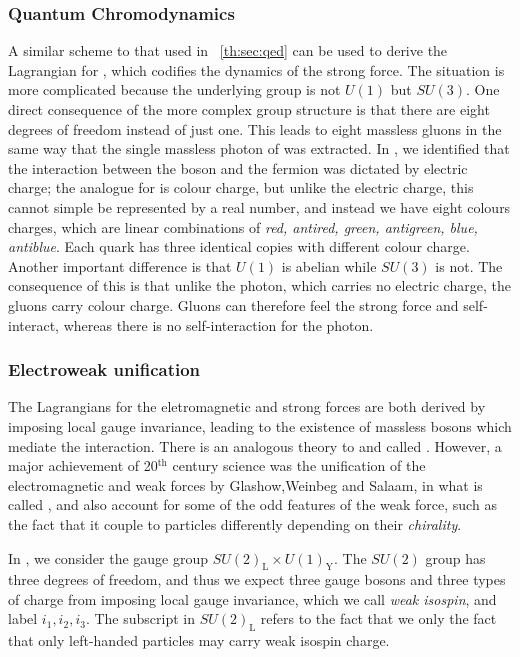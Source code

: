 \subsubsection{Quantum Chromodynamics}

A similar scheme to that used in \Sec~\ref{th:sec:qed} can be used to derive the Lagrangian for \QCD, which codifies the dynamics of the strong force. The situation is more complicated because the underlying group is not $U(1)$ but $SU(3)$. One direct consequence of the more complex group structure is that there are eight degrees of freedom instead of just one. This leads to eight massless gluons in the same way that the single massless photon of \QED was extracted. In \QED, we identified that the interaction between the boson and the fermion was dictated by electric charge; the analogue for \QCD is colour charge, but unlike the electric charge, this cannot simple be represented by a real number, and instead we have eight colours charges, which are linear combinations of \emph{red, antired, green, antigreen, blue, antiblue}. Each \SM quark has three identical copies with different colour charge. Another important difference is that $U(1)$ is abelian while $SU(3)$ is not. The consequence of this is that unlike the \QED photon, which carries no electric charge, the \QCD gluons carry colour charge. Gluons can therefore feel the strong force and self-interact, whereas there is no self-interaction for the photon.

\subsubsection{Electroweak unification}

The Lagrangians for the eletromagnetic and strong forces are both derived by imposing local gauge invariance, leading to the existence of massless bosons which mediate the interaction. There is an analogous theory to \QED and \QCD called \QFD. However, a major achievement of 20$^{\textrm{th}}$ century science was the unification of the electromagnetic and weak forces by Glashow,Weinbeg and Salaam, in what is called \EWT, and also account for some of the odd features of the weak force, such as the fact that it couple to particles differently depending on their \emph{chirality}.

In \EWT, we consider the gauge group $SU(2)_{\textrm{L}} \times U(1)_{\textrm{Y}}$. The $SU(2)$ group has three degrees of freedom, and thus we expect three gauge bosons and three types of charge from imposing local gauge invariance, which we call \emph{weak isospin}, and label $i_1, i_2, i_3$. The subscript in $SU(2)_{\textrm{L}}$ refers to the fact that we only the fact that only left-handed particles may carry weak isospin charge.

